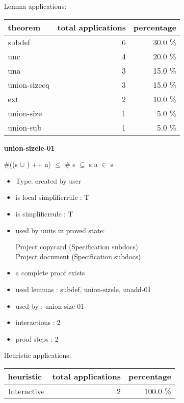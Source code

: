 \documentclass[a4paper]{article}
\begin{document}
Lemma applications:

\begin{supertabular}{l|r|r}
theorem	        & total applications & percentage \\ \hline
subdef & 6 & 30.0 \% \\
unc & 4 & 20.0 \% \\
una & 3 & 15.0 \% \\
union-sizeeq & 3 & 15.0 \% \\
ext & 2 & 10.0 \% \\
union-size & 1 & 5.0 \% \\
union-sub & 1 & 5.0 \% \\

\end{supertabular}
\pagebreak

{\LARGE\bf union-sizele-01}\label{lemma-union-sizele-01}

\medskip

 \Fol \#((s $\cup$ ) ++ a) $\le$ \# s \Equiv {} $\subseteq$ s \And a $\in$ s

\begin{itemize}

\item Type: created by user

\item is local simplifierrule : T
\item is simplifierrule : T
\item used by units in proved state:

Project copycard (Specification subdocs) \\
Project document (Specification subdocs)
\item       a complete proof exists
\item       used lemmas  : subdef, union-sizele, unadd-01
\item       used by      : union-size-01
\item       interactions : 2
\item       proof steps  : 2
\end{itemize}

\medskip


Heuristic applications:

\begin{supertabular}{l|r|r}
heuristic	& total applications & percentage \\ \hline
Interactive & 2 & 100.0 \% \\

\end{supertabular}
\end{document}
